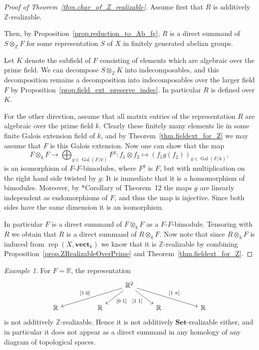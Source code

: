 \documentclass[a4paper]{amsart}
\theoremstyle{plain}
\theoremstyle{definition}
\theoremstyle{remark}
\newtheorem{example}[theorem]{Example}
\newcommand{\Set}{\mathbf{Set}}
\newcommand{\vect}{\mathbf{vect}}
\newcommand{\Z}{\mathbb{Z}}
\DeclareMathOperator{\rep}{rep}
\begin{document}
\begin{proof}[Proof of Theorem~\ref{thm.char_of_Z_realizable}]
Assume first that \( R \) is additively \( \Z \)-realizable.

Then, by Proposition~\ref{prop.reduction_to_Ab_fg}, \( R \) is a direct summand of \( S \otimes_{\Z} F \) for some representation \( S \) of \( X \) in finitely generated abelian groups.

Let \( K \) denote the subfield of \( F \) consisting of elements which are algebraic over the prime field. We can decompose \( S \otimes_{\Z} K \) into indecomposables, and this decomposition remains a decomposition into indecomposables over the larger field \( F \) by Proposition~\ref{prop.field_ext_preserve_indec}. In particular \( R \) is defined over \( K \).

\medskip
For the other direction, assume that all matrix entries of the representation \( R \) are algebraic over the prime field \( k \). Clearly these finitely many elements lie in some finite Galois extension field of \( k \), and by Theorem~\ref{thm.fieldext_for_Z} we may assume that \( F \) is this Galois extension. Now one can show that the map
\[ F \otimes_k F \to \bigoplus_{g \in \operatorname{Gal}(F/k)} F^g \colon f_1 \otimes f_2 \mapsto (f_1 g(f_2))_{g \in \operatorname{Gal}(F/k)}, \]
is an isomorphism of \( F \)-\( F \)-bimodules, where \( F^g \) is \( F \), but with multiplication on the right hand side twisted by \( g \): It is immediate that it is a homomorphism of bimodules. Moreover, by \cite{Artin_GaloisTheory}*{Corollary of Theorem~12} the maps \( g \) are linearly independent as endomorphisms of \( F \), and thus the map is injective. Since both sides have the same dimension it is an isomorphism.

In particular \( F \) is a direct summand of \( F \otimes_k F \) as a \( F \)-\( F \)-bimodule. Tensoring with \( R \) we obtain that \( R \) is a direct summand of \( R \otimes_k F \). Now note that since \( R \otimes_k F \) is induced from \( \rep(X, \vect_k) \) we know that it is \( \Z \)-realizable by combining Proposition~\ref{prop.ZRealizableOverPrime} and Theorem~\ref{thm.fieldext_for_Z}.
\end{proof}

\begin{example}
\label{ex:D4-trans}
For \( F = \mathbb{R} \), the representation
\[ \begin{tikzcd}
&&& \mathbb{R}^2 \ar[llld,swap,"{[1\;0]}"] \ar[ld,"{[0\;1]}"] \ar[rd,swap,"{[1\;1]}"] \ar[rrrd,"{[1\;\pi]}"] \\
\mathbb{R} && \mathbb{R} && \mathbb{R} && \mathbb{R}
\end{tikzcd} \]
is not additively \( \Z \)-realizable. Hence it is not additively \( \Set \)-realizable either, and in particular it does not appear as a direct summand in any homology of any diagram of topological spaces.
\end{example}
\end{document}
